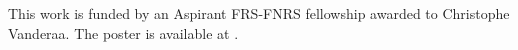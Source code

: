 \documentclass{article}
\begin{document}
\begin{multicols}{2}
\vspace{0.5cm}
\noindent
This work is funded by an Aspirant FRS-FNRS fellowship awarded to Christophe Vanderaa. The poster is available at {\color{blue}{https://github.com/cvanderaa/EuroBioc2019-Poster}}.



\scriptsize
 


\end{multicols}
\end{document}
